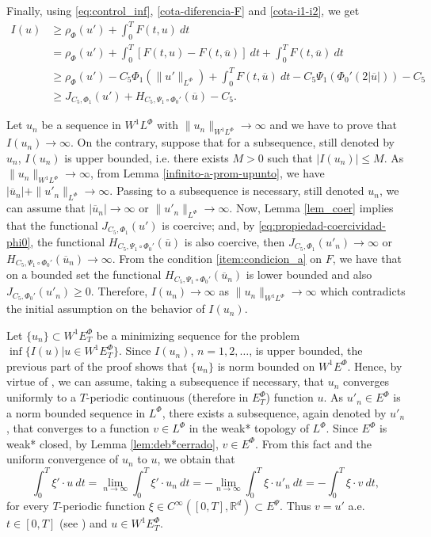 \documentclass[twoside]{elsarticle}
\theoremstyle{remark}
\newcommand{\orlnor}{\|_{L^{\Phi}}}
\newcommand{\lphi}{L^{\Phi}}
\newcommand{\ephi}{E^{\Phi}}
\newcommand{\wphi}{W^{1}\lphi}
\newcommand{\wphiet}{W^{1}\ephi_T}
\newcommand{\wphie}{W^{1}\ephi}
\newcommand{\sobnor}{\|_{W^{1}\lphi}}
\newcommand{\rr}{\mathbb{R}}
\renewcommand{\leq}{\leqslant}
\renewcommand{\geq}{\geqslant}
\newcommand{\epsi}{E^{\Psi}}
\begin{document}
Finally, using  \eqref{eq:control_inf},  \eqref{cota-diferencia-F} and
\eqref{cota-i1-i2}, we get
\begin{equation}\label{cota_inf_I}
\begin{split}
I(u)&
\geq\rho_{\Phi}(u')+\int_0^TF(t,u)\ dt
\\
&=\rho_{\Phi}( u')+ \int_0^T \left[F(t,u)-F(t,\overline{u})\right]\ dt
+  \int_0^TF(t,\overline{u})\ dt
\\
&\geq \rho_{\Phi}( u')
-C_5 \Phi_1(\|u'\orlnor)
+\int_0^TF(t,\overline{u})\ dt-
C_5 \Psi_1(\Phi_0'(2|\overline{u}|))-
C_5
\\
&\geq
J_{C_5,\Phi_1}(u')
+H_{C_5, \Psi_1\circ\Phi_0'}(\overline{u})
-C_5.
\end{split}
\end{equation}



Let $u_n$ be  a sequence in $\wphi$ with
$\|u_n\sobnor\to\infty$ and we have to prove that $I(u_n)\to\infty$.
On the contrary, suppose  that for a subsequence,
still denoted by $u_n$, $I(u_n)$ is upper bounded, i.e. there exists $M>0$ such that $|I(u_{n})|\leq M$.
As $\|u_n\sobnor\to\infty$, from Lemma \ref{infinito-a-prom-upunto},  we have $|\overline{u}_n|+\|u'_n\orlnor\to \infty$. Passing to a subsequence is necessary, still denoted $u_n$, we can assume that $|\overline{u}_n|\to \infty$ or $\|u'_n\orlnor\to \infty$.
Now, Lemma \ref{lem_coer} implies that the functional $J_{C_5,\Phi_1}(u')$ is coercive;
and, by \eqref{eq:propiedad-coercividad-phi0},
the functional $H_{C_5,\Psi_1\circ\Phi_0'}(\overline{u})$ is also coercive, then
$J_{C_5,\Phi_1}(u'_n) \to \infty$ or $H_{C_5,\Psi_1\circ\Phi_0'}(\overline{u}_n)\to \infty$.
From the condition \ref{item:condicion_a}  on $F$, we have that on a bounded set the functional $H_{C_5,\Psi_1\circ\Phi_0'}(\overline{u}_n)$ is lower bounded and
also $J_{C_5,\Phi_0'}(u'_n)\geq 0$.
Therefore,  $I(u_n)\to\infty$ as $\|u_n\sobnor\to\infty$ which contradicts the initial assumption on the behavior of $I(u_n)$.

Let $\{u_n\}\subset \wphiet$  be a  minimizing sequence for the problem  $\inf\{I(u)|u\in\wphiet\}$.
Since  $I(u_n)$, $n=1,2,\ldots$,  is upper bounded, the previous part of the proof shows that $\{u_n\}$ is norm bounded on $\wphie$. Hence, by virtue of  \cite[Cor. 2.2]{ABGMS2015}, we can assume, taking a subsequence if necessary, that $u_n$ converges uniformly to a $T$-periodic continuous (therefore in $\ephi_T$)  function $u$. As $u'_n \in \ephi$ is a norm bounded sequence in $\lphi$,
there exists a subsequence, again denoted by $u'_n$, that converges to a function $v\in\lphi$ in the weak* topology of $\lphi$.
Since $\ephi$ is weak* closed, by Lemma \ref{lem:deb*cerrado}, $v\in \ephi$.
From this fact and the uniform convergence of $u_n$ to $u$, we obtain that
\[
\int_0^T\xi'\cdot u\ dt=\lim_{n\to\infty}\int_0^T\xi'\cdot u_n \ dt=
-\lim_{n\to\infty}\int_0^T\xi\cdot u'_n\ dt=-\int_0^T\xi\cdot v\ dt,
\]
for every $T$-periodic function $\xi\in C^{\infty}([0,T],\rr^d)\subset\epsi$.
Thus $v=u'$ a.e. $t\in [0,T]$ (see \cite[p. 6]{mawhin2010critical}) and $u\in\wphiet$.
\end{document}
